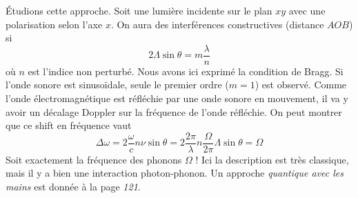 Étudions cette approche. Soit une lumière incidente sur le plan $xy$ avec une polarisation selon l'axe $x$. 
On aura des interférences constructives (distance $AOB$) si
\begin{equation}
2\Lambda\sin\theta = m\dfrac{\lambda}{n}
\end{equation}
où $n$ est l'indice non perturbé. Nous avons ici exprimé la condition de Bragg. Si l'onde sonore est 
sinusoïdale, seule le premier ordre ($m=1$) est observé. Comme l'onde électromagnétique est réfléchie par une
onde sonore en mouvement, il va y avoir un décalage Doppler sur la fréquence de l'onde réfléchie. On peut montrer
que ce shift en fréquence vaut
\begin{equation}
\Delta\omega = 2\dfrac{\omega}{c}n\nu \sin\theta = 2\dfrac{2\pi}{\lambda}n\dfrac{\Omega}{2\pi}\Lambda\sin\theta=\Omega
\end{equation}
Soit exactement la fréquence des phonons $\Omega$ ! Ici la description est très classique, mais il y a bien une
interaction photon-phonon. Un approche \textit{quantique avec les mains} est donnée à la page \textit{121}.

